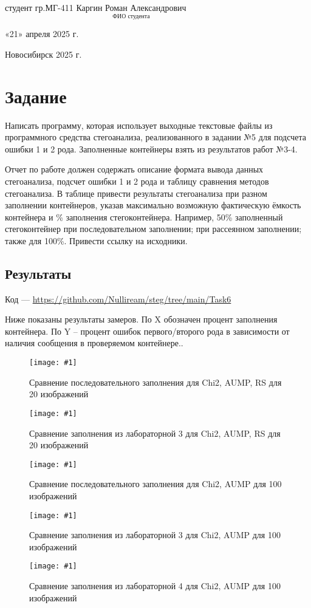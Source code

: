 \documentclass[12pt, a4paper, english, russian]{article}
\newcommand{\pic}[2]{
	\begin{figure}[H]
		\centering
		\texttt{[image: \#1]}
		\caption{#2}
	\end{figure}
}
\begin{document}
\begin{titlepage}
\begin{flushleft}
\begin{large}
			студент гр.МГ-411 \hfill $\underset{\text{ФИО студента}}{\text{Каргин Роман Александрович}}$

			«21» апреля 2025 г.

		\end{large}
	\end{flushleft}

	\vfill

	\begin{center}
		\begin{large}
			Новосибирск 2025 г.
		\end{large}
	\end{center}

\end{titlepage}

\tableofcontents

\pagebreak

\section{Задание}

Написать программу, которая использует выходные текстовые файлы из программного средства стегоанализа, реализованного в задании №5 для подсчета ошибки 1 и 2 рода. Заполненные контейнеры взять из результатов работ №3-4.

Отчет по работе должен содержать описание формата вывода данных стегоанализа, подсчет ошибки 1 и 2 рода и таблицу сравнения методов стегоанализа. В таблице привести результаты стегоанализа при разном заполнении контейнеров, указав максимально возможную фактическую ёмкость контейнера и \% заполнения стегоконтейнера. Например, 50\% заполненный стегоконтейнер при последовательном заполнении; при рассеянном заполнении; также для 100\%. Привести ссылку на исходники.
\pagebreak

\subsection{Результаты}
Код --- \url{https://github.com/Nulliream/steg/tree/main/Task6}

Ниже показаны результаты замеров. По X обозначен процент заполнения контейнера. По Y --
процент ошибок первого/второго рода в зависимости от наличия сообщения в проверяемом контейнере..
\pic{images/seq-20.png}{Сравнение последовательного заполнения для Chi2, AUMP, RS для 20 изображений}
\pic{images/lab3-20.png}{Сравнение заполнения из лабораторной 3 для Chi2, AUMP, RS для 20 изображений}
\pic{images/seq-100.png}{Сравнение последовательного заполнения для Chi2, AUMP для 100 изображений}
\pic{images/lab3-100.png}{Сравнение заполнения из лабораторной 3 для Chi2, AUMP для 100 изображений}
\pic{images/lab4-100.png}{Сравнение заполнения из лабораторной 4 для Chi2, AUMP для 100 изображений}
\end{document}
